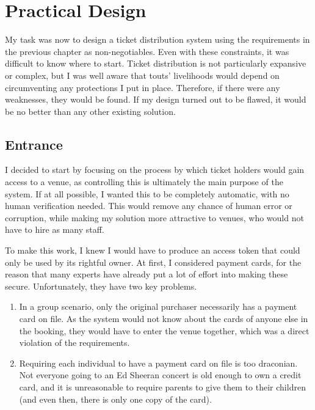 \documentclass[12pt,a4paper]{bhamdissertation}
\begin{document}
\chapter{Practical Design} \label{practical_design}

My task was now to design a ticket distribution system using the requirements in the previous chapter as non-negotiables. Even with these constraints, it was difficult to know where to start. Ticket distribution is not particularly expansive or complex, but I was well aware that touts' livelihoods would depend on circumventing any protections I put in place. Therefore, if there were any weaknesses, they would be found. If my design turned out to be flawed, it would be no better than any other existing solution.

\section{Entrance}

I decided to start by focusing on the process by which ticket holders would gain access to a venue, as controlling this is ultimately the main purpose of the system. If at all possible, I wanted this to be completely automatic, with no human verification needed. This would remove any chance of human error or corruption, while making my solution more attractive to venues, who would not have to hire as many staff.

To make this work, I knew I would have to produce an access token that could only be used by its rightful owner. At first, I considered payment cards, for the reason that many experts have already put a lot of effort into making these secure. Unfortunately, they have two key problems.

\begin{enumerate}
    \item In a group scenario, only the original purchaser necessarily has a payment card on file. As the system would not know about the cards of anyone else in the booking, they would have to enter the venue together, which was a direct violation of the requirements.
    \item Requiring each individual to have a payment card on file is too draconian. Not everyone going to an Ed Sheeran concert is old enough to own a credit card, and it is unreasonable to require parents to give them to their children (and even then, there is only one copy of the card).
\end{enumerate}
\end{document}
